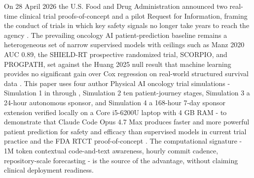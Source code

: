\noindent
On 28 April 2026 the U.S. Food and Drug Administration announced two
real-time clinical trial proofs-of-concept and a pilot Request for
Information, framing the conduct of trials in which key safety signals
no longer take years to reach the agency \cite{fda2026realtime}. The
prevailing oncology AI patient-prediction baseline remains a
heterogeneous set of narrow supervised models with ceilings such as
Manz 2020 AUC 0.89, the SHIELD-RT prospective randomized trial,
SCORPIO, and PROGPATH, set against the Huang 2025 null result that
machine learning provides no significant gain over Cox regression on
real-world structured survival data
\cite{Manz2020Oncology180DayMortality, Hong2020SHIELDRT,
Huang2025CancerSurvivalMetaAnalysis}. This paper uses four author
Physical AI oncology trial simulations - Simulation 1 in
 through , Simulation 2 ten patient-journey
stages, Simulation 3 a 24-hour autonomous sponsor, and Simulation 4 a
168-hour 7-day sponsor extension verified locally on a Core i5-6200U
laptop with 4 GB RAM - to demonstrate that Claude Code Opus 4.7 Max
produces faster and more powerful patient prediction for safety and
efficacy than supervised models in current trial practice and the FDA
RTCT proof-of-concept \cite{kawchak_2026_19176370,
kawchak_2026_19119939, kawchak_2026_19396256}. The computational
signature - 1M token contextual code-and-text awareness, hourly commit
cadence, repository-scale forecasting - is the source of the advantage,
without claiming clinical deployment readiness.
